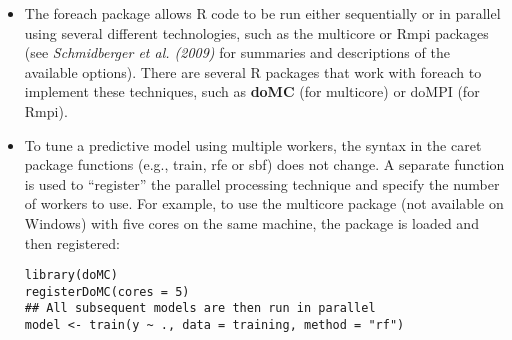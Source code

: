 \begin{itemize}
\item The foreach package allows R code to be run either sequentially or
in parallel using several different technologies, such as the multicore or Rmpi
packages (see \textit{Schmidberger et al. (2009)} for summaries and descriptions of
the available options). There are several R packages that work with foreach
to implement these techniques, such as \textbf{doMC} (for multicore) or doMPI (for
Rmpi).
\item To tune a predictive model using multiple workers, the syntax in the caret
package functions (e.g., train, rfe or sbf) does not change. A separate function
is used to “register” the parallel processing technique and specify the number
of workers to use. For example, to use the multicore package (not available
on Windows) with five cores on the same machine, the package is loaded and
then registered:

\begin{framed}
\begin{verbatim}
library(doMC)
registerDoMC(cores = 5)
## All subsequent models are then run in parallel
model <- train(y ~ ., data = training, method = "rf")
\end{verbatim}
\end{framed}


\end{itemize}
